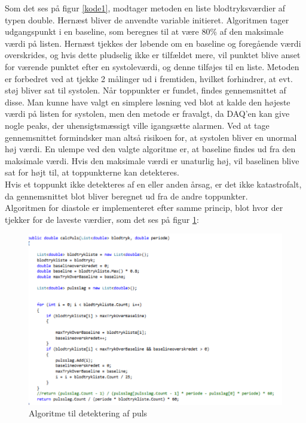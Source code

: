 Som det ses på figur \ref{kode1}, modtager metoden en liste blodtryksværdier af typen double. Hernæst bliver de anvendte variable initieret. Algoritmen tager udgangspunkt i en baseline, som beregnes til at være 80\% af den maksimale værdi på listen. Hernæst tjekkes der løbende om en baseline og foregående værdi overskrides, og hvis dette pludselig ikke er tilfældet mere, vil punktet blive anset for værende punktet efter en systoleværdi, og denne tilføjes til en liste. Metoden er forbedret ved at tjekke 2 målinger ud i fremtiden, hvilket forhindrer, at evt. støj bliver sat til systolen. Når toppunkter er fundet, findes gennemsnittet af disse. Man kunne have valgt en simplere løsning ved blot at kalde den højeste værdi på listen for systolen, men den metode er fravalgt, da DAQ'en kan give nogle peaks, der uhensigtsmæssigt ville igangsætte alarmen. Ved at tage gennemsnittet formindsker man altså risikoen for, at systolen bliver en unormal høj værdi. En ulempe ved den valgte algoritme er, at baseline findes ud fra den maksimale værdi. Hvis den maksimale værdi er unaturlig høj, vil baselinen blive sat for højt til, at toppunkterne kan detekteres.\\
Hvis et toppunkt ikke detekteres af en eller anden årsag, er det ikke katastrofalt, da gennemsnittet blot bliver beregnet ud fra de andre toppunkter.\\
Algoritmen for diastole er implementeret efter samme princip, blot hvor der tjekker for de laveste værdier, som det ses på figur \ref{kode2}:
\begin{figure}[H]
	\includegraphics[width=1.3\textwidth]{Figurer/Jeppe/2}
	\caption{Algoritme til detektering af puls}
	\label{kode2}
\end{figure}
